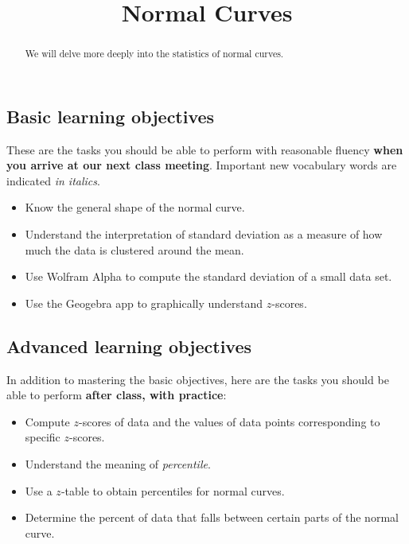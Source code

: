 \documentclass{ximera}
\title{Normal Curves}
\begin{document}
\begin{abstract}
We will delve more deeply into the statistics of normal curves.
\end{abstract}
\maketitle

\subsection*{Basic learning objectives}

These are the tasks you should be able to perform with reasonable fluency \textbf{when you arrive at our next class meeting}. Important new vocabulary words are indicated \emph{in italics}. 

\begin{itemize}
    \item Know the general shape of the normal curve.
    \item Understand the interpretation of standard deviation as a measure of how much the data is clustered around the mean.
    \item Use Wolfram Alpha to compute the standard deviation of a small data set.
    \item Use the Geogebra app to graphically understand $z$-scores.
\end{itemize}

\subsection*{Advanced learning objectives}

In addition to mastering the basic objectives, here are the tasks you should be able to perform \textbf{after class, with practice}: 

\begin{itemize}
	\item Compute $z$-scores of data and the values of data points corresponding to specific $z$-scores.
    \item Understand the meaning of \emph{percentile}.
	\item Use a $z$-table to obtain percentiles for normal curves.
    \item Determine the percent of data that falls between certain parts of the normal curve.
\end{itemize}
\end{document}
